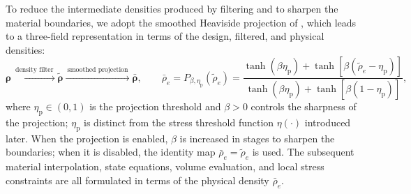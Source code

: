 To reduce the intermediate densities produced by filtering and to sharpen the material boundaries, we adopt the smoothed Heaviside projection of \cite{Wang2011}, which leads to a three-field representation in terms of the design, filtered, and physical densities:
\begin{equation}
\label{eq:heaviside_projection}
\boldsymbol{\rho} \xrightarrow{\ \text{density filter}\ } \tilde{\boldsymbol{\rho}} \xrightarrow{\ \text{smoothed projection}\ } \bar{\boldsymbol{\rho}},
\qquad
\bar{\rho}_e = P_{\beta,\eta_{\mathrm p}}(\tilde{\rho}_e)
= \frac{\tanh(\beta \eta_{\mathrm p}) + \tanh\!\left[\beta(\tilde{\rho}_e - \eta_{\mathrm p})\right]}
{\tanh(\beta \eta_{\mathrm p}) + \tanh\!\left[\beta(1 - \eta_{\mathrm p})\right]},
\end{equation}
where $\eta_{\mathrm p} \in (0, 1)$ is the projection threshold and $\beta > 0$ controls the sharpness of the projection; $\eta_{\mathrm p}$ is distinct from the stress threshold function $\eta(\cdot)$ introduced later. When the projection is enabled, $\beta$ is increased in stages to sharpen the boundaries; when it is disabled, the identity map $\bar{\rho}_e = \tilde{\rho}_e$ is used. The subsequent material interpolation, state equations, volume evaluation, and local stress constraints are all formulated in terms of the physical density $\bar{\rho}_e$.

